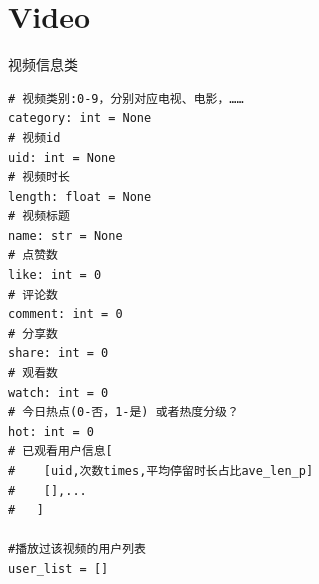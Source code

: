 \documentclass{article}
\begin{document}
\section{Video}
视频信息类
\begin{lstlisting}
# 视频类别:0-9，分别对应电视、电影，……
category: int = None
# 视频id
uid: int = None
# 视频时长
length: float = None
# 视频标题
name: str = None
# 点赞数
like: int = 0
# 评论数
comment: int = 0
# 分享数
share: int = 0
# 观看数
watch: int = 0
# 今日热点(0-否，1-是) 或者热度分级？
hot: int = 0
# 已观看用户信息[
#    [uid,次数times,平均停留时长占比ave_len_p]
#    [],...
#   ]

#播放过该视频的用户列表
user_list = []
\end{lstlisting}
\end{document}
